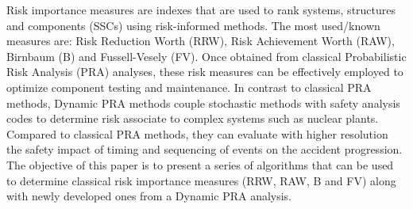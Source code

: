 Risk importance measures are indexes that are used to rank systems, 
structures and components (SSCs) using risk-informed methods. 
The most used/known measures are: Risk Reduction Worth (RRW), 
Risk Achievement Worth (RAW), Birnbaum (B) and Fussell-Vesely (FV). 
Once obtained from classical Probabilistic Risk Analysis (PRA) analyses, 
these risk measures can be effectively employed to optimize component 
testing and maintenance. In contrast to classical PRA methods, 
Dynamic PRA methods couple stochastic methods with safety analysis 
codes to determine risk associate to complex systems such as nuclear 
plants. Compared to classical PRA methods, they can evaluate with 
higher resolution the safety impact of timing and sequencing of events 
on the accident progression. The objective of this paper is to present 
a series of algorithms that can be used to determine classical risk 
importance measures (RRW, RAW, B and FV) along with newly developed 
ones from a Dynamic PRA analysis. 